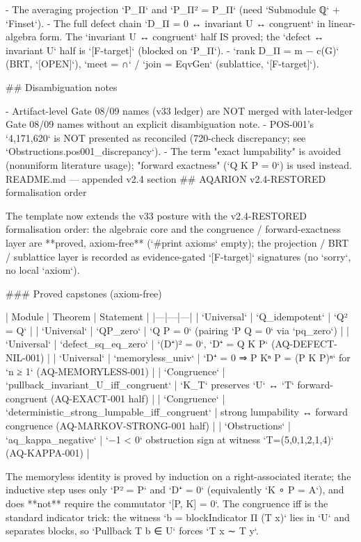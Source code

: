 - The averaging projection `P_Π` and `P_Π² = P_Π` (need `Submodule ℚ` + `Finset`).
- The full defect chain `D_Π = 0 ↔ invariant U ↔ congruent` in linear-algebra
  form. The `invariant U ↔ congruent` half IS proved; the `defect ↔ invariant U`
  half is `[F-target]` (blocked on `P_Π`).
- `rank D_Π = m − c(G)` (BRT, `[OPEN]`), `meet = ∩` / `join = EqvGen`
  (sublattice, `[F-target]`).

## Disambiguation notes

- Artifact-level Gate 08/09 names (v33 ledger) are NOT merged with later-ledger
  Gate 08/09 names without an explicit disambiguation note.
- POS-001's `4,171,620` is NOT presented as reconciled (720-check discrepancy;
  see `Obstructions.pos001_discrepancy`).
- The term "exact lumpability" is avoided (nonuniform literature usage);
  "forward exactness" (`Q K P = 0`) is used instead.
README.md — appended v2.4 section
## AQARION v2.4-RESTORED formalisation order

The template now extends the v33 posture with the v2.4-RESTORED formalisation
order: the algebraic core and the congruence / forward-exactness layer are
**proved, axiom-free** (`#print axioms` empty); the projection / BRT / sublattice
layer is recorded as evidence-gated `[F-target]` signatures (no `sorry`, no
local `axiom`).

### Proved capstones (axiom-free)

| Module | Theorem | Statement |
|---|---|---|
| `Universal` | `Q_idempotent` | `Q² = Q` |
| `Universal` | `QP_zero` | `Q P = 0` (pairing `P Q = 0` via `pq_zero`) |
| `Universal` | `defect_sq_eq_zero` | `(D⁺)² = 0`, `D⁺ = Q K P` (AQ-DEFECT-NIL-001) |
| `Universal` | `memoryless_univ` | `D⁺ = 0 ⇒ P Kⁿ P = (P K P)ⁿ` for `n ≥ 1` (AQ-MEMORYLESS-001) |
| `Congruence` | `pullback_invariant_U_iff_congruent` | `K_T` preserves `U` ↔ `T` forward-congruent (AQ-EXACT-001 half) |
| `Congruence` | `deterministic_strong_lumpable_iff_congruent` | strong lumpability ↔ forward congruence (AQ-MARKOV-STRONG-001 half) |
| `Obstructions` | `aq_kappa_negative` | `−1 < 0` obstruction sign at witness `T=(5,0,1,2,1,4)` (AQ-KAPPA-001) |

The memoryless identity is proved by induction on a right-associated iterate;
the inductive step uses only `P² = P` and `D⁺ = 0` (equivalently `K ∘ P = A`),
and does **not** require the commutator `[P, K] = 0`. The congruence iff is the
standard indicator trick: the witness `b = blockIndicator Π (T x)` lies in `U`
and separates blocks, so `Pullback T b ∈ U` forces `T x ∼ T y`.


